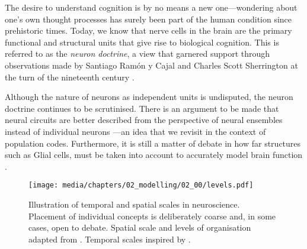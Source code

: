
The desire to understand cognition is by no means a new one---wondering about one's own thought processes has surely been part of the human condition since prehistoric times.
Today, we know that nerve cells in the brain are the primary functional and structural units that give rise to biological cognition.
This is referred to as the \emph{neuron doctrine}, a view that garnered support through observations made by Santiago Ramón y Cajal and Charles Scott Sherrington at the turn of the nineteenth century \citep[Chapter~2]{yuste2015neuron,bear2016neuroscience}.

Although the nature of neurons as independent units is undisputed, the neuron doctrine continues to be scrutinised.
There is an argument to be made that neural circuits are better described from the perspective of neural ensembles instead of individual neurons \citep{yuste2015neuron,churchland1992computational}---an idea that we revisit in the context of population codes.
Furthermore, it is still a matter of debate in how far structures such as Glial cells, must be taken into account to accurately model brain function \citep[e.g.,][]{verkhratsky2000ion}.


\begin{figure}
	\centering
	\texttt{[image: media/chapters/02\_modelling/02\_00/levels.pdf]}
	\caption[Illustration of temporal and spatial scales in neuroscience]{Illustration of temporal and spatial scales in neuroscience. Placement of individual concepts is deliberately coarse and, in some cases, open to debate. Spatial scale and levels of organisation adapted from \citet[Figure~1.4, p.~11]{churchland1992computational}.
	Temporal scales inspired by \citet[Figure~1]{sejnowski2014putting}.
	}
	\label{fig:spatial_and_temporal_scales}
	\vspace*{-0.5em}
\end{figure}

